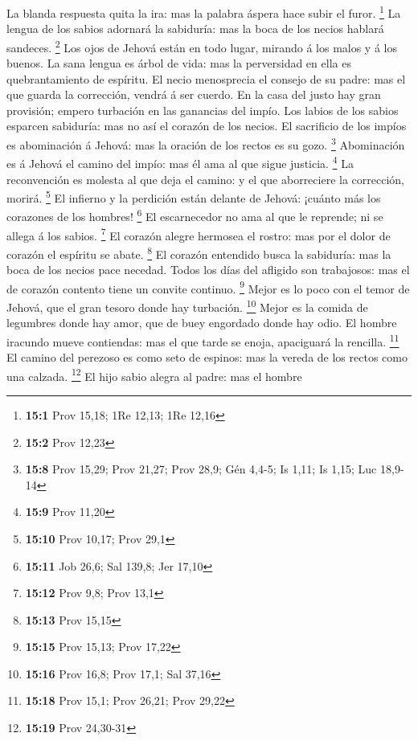  La blanda respuesta quita la ira: mas la palabra áspera
hace subir el furor. \footnote{\textbf{15:1} Prov 15,18; 1Re 12,13; 1Re
  12,16}  La lengua de los sabios adornará la sabiduría: mas
la boca de los necios hablará sandeces. \footnote{\textbf{15:2} Prov
  12,23}  Los ojos de Jehová están en todo lugar, mirando á
los malos y á los buenos.  La sana lengua es árbol de vida:
mas la perversidad en ella es quebrantamiento de espíritu. 
El necio menosprecia el consejo de su padre: mas el que guarda la
corrección, vendrá á ser cuerdo.  En la casa del justo hay
gran provisión; empero turbación en las ganancias del impío.
 Los labios de los sabios esparcen sabiduría: mas no así el
corazón de los necios.  El sacrificio de los impíos es
abominación á Jehová: mas la oración de los rectos es su gozo.
\footnote{\textbf{15:8} Prov 15,29; Prov 21,27; Prov 28,9; Gén 4,4-5; Is
  1,11; Is 1,15; Luc 18,9-14}  Abominación es á Jehová el
camino del impío: mas él ama al que sigue justicia. \footnote{\textbf{15:9}
  Prov 11,20}  La reconvención es molesta al que deja el
camino: y el que aborreciere la corrección, morirá. \footnote{\textbf{15:10}
  Prov 10,17; Prov 29,1}  El infierno y la perdición están
delante de Jehová: ¡cuánto más los corazones de los hombres! \footnote{\textbf{15:11}
  Job 26,6; Sal 139,8; Jer 17,10}  El escarnecedor no ama
al que le reprende; ni se allega á los sabios. \footnote{\textbf{15:12}
  Prov 9,8; Prov 13,1}  El corazón alegre hermosea el
rostro: mas por el dolor de corazón el espíritu se abate. \footnote{\textbf{15:13}
  Prov 15,15}  El corazón entendido busca la sabiduría: mas
la boca de los necios pace necedad.  Todos los días del
afligido son trabajosos: mas el de corazón contento tiene un convite
continuo. \footnote{\textbf{15:15} Prov 15,13; Prov 17,22} 
Mejor es lo poco con el temor de Jehová, que el gran tesoro donde hay
turbación. \footnote{\textbf{15:16} Prov 16,8; Prov 17,1; Sal 37,16}
 Mejor es la comida de legumbres donde hay amor, que de
buey engordado donde hay odio.  El hombre iracundo mueve
contiendas: mas el que tarde se enoja, apaciguará la rencilla.
\footnote{\textbf{15:18} Prov 15,1; Prov 26,21; Prov 29,22}
 El camino del perezoso es como seto de espinos: mas la
vereda de los rectos como una calzada. \footnote{\textbf{15:19} Prov
  24,30-31}  El hijo sabio alegra al padre: mas el hombre
